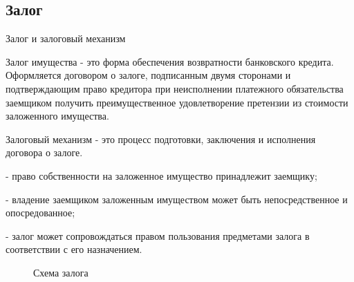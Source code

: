 \documentclass[_Banking_p3.tex]{subfiles}
\begin{document}
\subsection{Залог}
\begin{frame} [ allowframebreaks]{Залог и залоговый механизм}
\begin{block}{Залог имущества }
\quad
- это форма обеспечения возвратности банковского кредита. Оформляется договором о залоге, подписанным двумя сторонами и подтверждающим право кредитора при неисполнении платежного обязательства заемщиком получить преимущественное удовлетворение претензии из стоимости заложенного имущества.
\end{block}
\pagebreak

\begin{block}{ Залоговый механизм }
\quad
- это процесс подготовки, заключения и исполнения договора о залоге.
\end{block}
- право собственности на заложенное имущество принадлежит заемщику;

- владение заемщиком заложенным имуществом может быть непосредственное и опосредованное;

- залог может сопровождаться правом пользования предметами залога в соответствии с его назначением.
\end{frame}

\begin{frame}[shrink=15]
\begin{figure}
\center
\begin{overprint}
\end{overprint}
\vspace*{-2em}
\caption{Схема залога}
\end{figure}

\end{frame}
\end{document}
